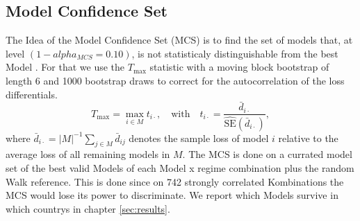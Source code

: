 



\subsection{Model Confidence Set}
\label{sec:eval:mcs}
The Idea of the Model Confidence Set (MCS) is to find the set of models that, at level $(1 - alpha_{MCS}=0.10)$, is not statisticaly distinguishable from the best Model \citep{hansen2011model}. For that we use the $T_{\max}$ statistic with a moving block bootstrap of length 6 and 1000 bootstrap draws to correct for the autocorrelation of the loss differentials.
\begin{equation}
    T_{\max} = \max_{i \in M} t_{i\cdot}, \quad \text{with} \quad t_{i\cdot} = \frac{\bar{d}_{i\cdot}}{\widehat{\text{SE}}(\bar{d}_{i\cdot})},
\end{equation}
where $\bar{d}_{i\cdot} = |M|^{-1} \sum_{j \in M} \bar{d}_{ij}$ denotes the sample loss of model $i$ relative to the average loss of all remaining models in $M$. The MCS is done on a currated model set of the best valid Models of each Model x regime combination plus the random Walk reference. This is done since on 742 strongly correlated Kombinations the MCS would lose its power to discriminate. We report which Models survive in which countrys in chapter \ref{sec:results}.


